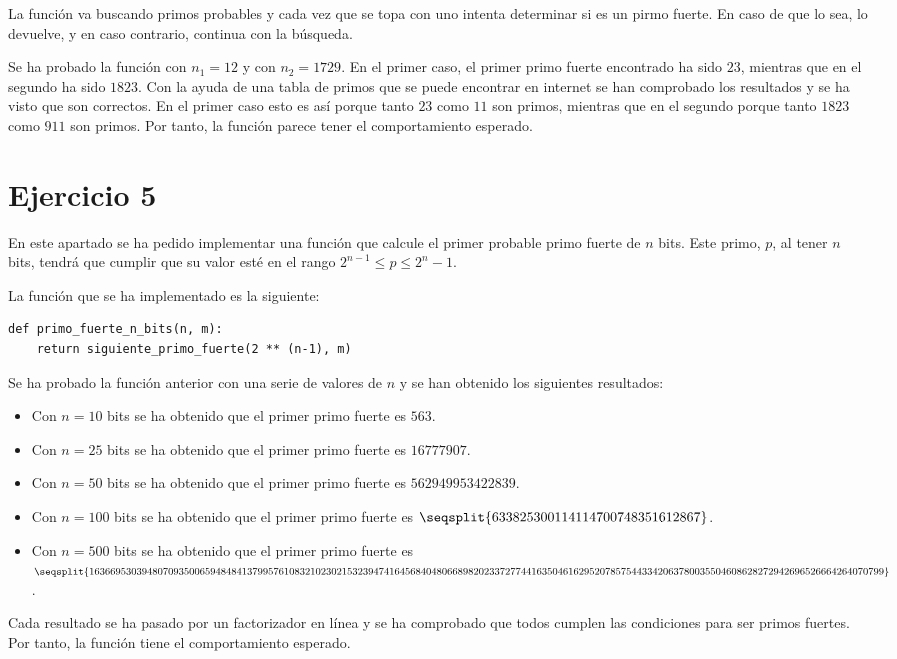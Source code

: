 \documentclass[11pt,a4paper]{article}
\newcommand{\nonumsection}[1]{\section*{#1}\addcontentsline{toc}{section}{#1}}
\begin{document}
La función va buscando primos probables y cada vez que se topa con uno intenta determinar
si es un pirmo fuerte. En caso de que lo sea, lo devuelve, y en caso contrario, continua
con la búsqueda.

Se ha probado la función con $n_1 = 12$ y con $n_2 = 1729$. En el primer caso, el primer
primo fuerte encontrado ha sido $23$, mientras que en el segundo ha sido $1823$. Con la ayuda
de una tabla de primos que se puede encontrar en internet se han comprobado los resultados y
se ha visto que son correctos. En el primer caso esto es así porque tanto $23$ como $11$ son
primos, mientras que en el segundo porque tanto $1823$ como $911$ son primos. Por tanto, la
función parece tener el comportamiento esperado.

\nonumsection{Ejercicio 5}

En este apartado se ha pedido implementar una función que calcule el primer probable primo
fuerte de $n$ bits. Este primo, $p$, al tener $n$ bits, tendrá que cumplir que su valor esté
en el rango $2^{n-1} \leq p \leq 2^n - 1$.

La función que se ha implementado es la siguiente:

\begin{lstlisting}
def primo_fuerte_n_bits(n, m):
    return siguiente_primo_fuerte(2 ** (n-1), m)
\end{lstlisting}

Se ha probado la función anterior con una serie de valores de $n$ y se han obtenido los
siguientes resultados:

\begin{itemize}
	\item Con $n = 10$ bits se ha obtenido que el primer primo fuerte es $563$.
	\item Con $n = 25$ bits se ha obtenido que el primer primo fuerte es $16777907$.
	\item Con $n = 50$ bits se ha obtenido que el primer primo fuerte es $562949953422839$.
	\item Con $n = 100$ bits se ha obtenido que el primer primo fuerte es
	$\seqsplit{633825300114114700748351612867}$.
	\item Con $n = 500$ bits se ha obtenido que el primer primo fuerte es
	$\seqsplit{1636695303948070935006594848413799576108321023021532394741645684048066898202337277441635046162952078575443342063780035504608628272942696526664264070799}$.
\end{itemize}

Cada resultado se ha pasado por un factorizador en línea y se ha comprobado que todos cumplen
las condiciones para ser primos fuertes. Por tanto, la función tiene el comportamiento esperado. 
\end{document}

